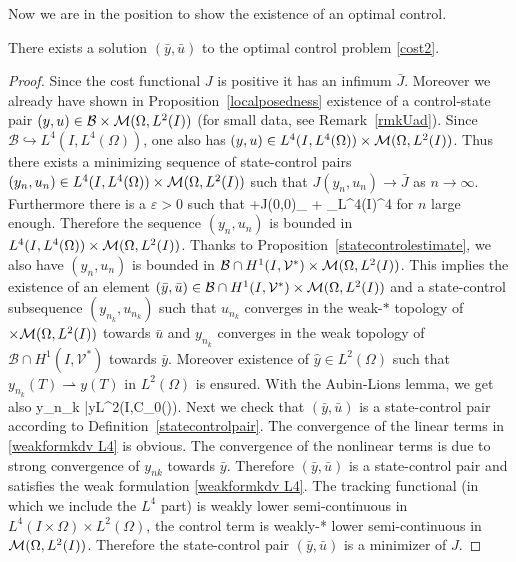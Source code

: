 Now we are in the position to show the existence of an optimal control.
\begin{prop}
There exists a solution $(\bar y, \bar u)$ to the optimal control problem \eqref{cost2}.
\end{prop}
\begin{proof}
Since the cost functional $J$ is positive it has an infimum $\bar J$. Moreover we already have shown in Proposition~\ref{localposedness} existence of a control-state pair $(y,u)\in \mathcal{B}\times \mathcal{M}(\Omega, L^{2}(I))$ (for small data, see Remark~\ref{rmkUad}). Since $\mathcal{B} \hookrightarrow L^4(I,L^4(\Omega))$, one also has $(y,u)\in  L^4(I,L^4(\Omega))\times \mathcal{M}(\Omega, L^{2}(I))$. Thus there exists a minimizing sequence of state-control pairs $(y_n,u_n) \in L^4(I,L^4(\Omega))\times \mathcal{M}(\Omega, L^{2}(I))$ such that $J(y_n, u_n) \rightarrow \bar J$ as $n \rightarrow \infty$. Furthermore there is a $\varepsilon>0$ such that
\be
\varepsilon+J(0,0)\geq \alpha {}_{\M} +  _{L^4(I\times \Omega)}^4
\ee
for $n$ large enough. Therefore the sequence $(y_n,u_n)$ is bounded in $L^4(I,L^4(\Omega))\times \mathcal{M}(\Omega, L^{2}(I))$. Thanks to Proposition~\ref{statecontrolestimate}, we also have $(y_n,u_n)$ is bounded in $\mathcal{B}\cap H^{1}(I, \mathcal{V}^{*})\times \mathcal{M}(\Omega, L^{2}(I))$. This implies the existence of an element $(\bar y, \bar u)\in \mathcal{B}\cap H^{1}(I, \mathcal{V}^{*})\times \mathcal{M}(\Omega, L^{2}(I))$ and a state-control subsequence $(y_{n_k},u_{n_k})$  such that $u_{n_k}$ converges in the weak-$*$ topology of $\times\mathcal{M}(\Omega, L^{2}(I))$ towards $\bar u$ and $y_{n_k}$ converges in the weak topology of $\mathcal{B}\cap H^{1}(I, \mathcal{V}^{*})$ towards $\bar y$. Moreover existence of $\hat y \in L^2(\Omega)$ such that $y_{n_k}(T) \rightharpoonup y(T)$ in $L^2(\Omega)$ is ensured. With the Aubin-Lions lemma, we get also
\be
\nonumber
y_{n_k} \rightarrow \bar y\quad{}\quad L^2(I,\mathcal C_0(\Omega)).
\ee
Next we check that $(\bar y, \bar u)$ is a state-control pair according to Definition~\ref{statecontrolpair}. The convergence of the linear terms in \eqref{weakformkdv L4} is obvious. The convergence of the nonlinear terms is due to strong convergence of $y_{nk}$ towards $\bar y$. %
Therefore $(\bar y, \bar u)$ is a state-control pair and satisfies the weak formulation \eqref{weakformkdv L4}. The tracking functional (in which we include the $L^4$ part) is weakly lower semi-continuous in $L^4(I\times \Omega)\times L^2(\Omega)$, the control term is weakly-* lower semi-continuous in $\mathcal{M}(\Omega, L^{2}(I))$. Therefore the state-control pair $(\bar y, \bar u)$ is a minimizer of $J$.
\end{proof}

